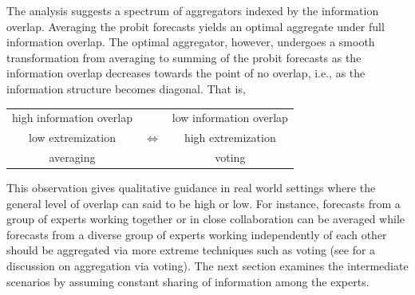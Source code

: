 \documentclass[11pt]{article}
\newtheorem{observation}[theorem]{Observation}
\newtheorem{proposition}[theorem]{Proposition}
\theoremstyle{definition}
\theoremstyle{definition}
\begin{document}
The analysis suggests a spectrum of aggregators indexed by the 
information overlap.  Averaging the probit forecasts yields an 
optimal aggregate under full information overlap.  The optimal 
aggregator, however, undergoes a smooth transformation from 
averaging to summing of the probit forecasts as the information 
overlap decreases towards the point of no overlap, i.e., as the 
information structure becomes diagonal.  
That is,
\begin{center}
\begin{tabular}{ccc}
high information overlap & & low information overlap\\
low extremization & {\Large $\Longleftrightarrow$} & high extremization \\
averaging  & & voting\\
\end{tabular}
\end{center}
This observation gives qualitative
guidance in real world settings where the general level of overlap 
can said to be high or low.  For instance, forecasts from a group 
of experts working together or in close collaboration can be 
averaged while forecasts from a diverse group of experts working 
independently of each other should be aggregated via more extreme 
techniques such as voting (see \citet{parunak2013characterizing} 
for a discussion on aggregation via voting). The next section examines the intermediate scenarios by assuming constant sharing of information among the experts. 

%
\end{document}
